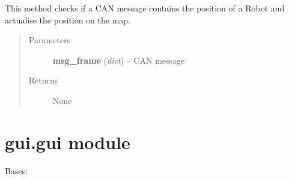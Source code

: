 \documentclass[letterpaper,10pt,english]{sphinxmanual}
\begin{document}
\begin{fulllineitems}
\begin{fulllineitems}
\begin{itemize}
\end{itemize}

\end{fulllineitems}


\begin{fulllineitems}
\label{gui:gui.field.GameField.setpoint}
This method checks if a CAN message contains the position of a Robot and actualise the position on the map.
\begin{quote}\begin{description}
\item[{Parameters}] \leavevmode
\textbf{msg\_frame} (\emph{dict}) -- CAN message

\item[{Returns}] \leavevmode
None

\end{description}\end{quote}

\end{fulllineitems}


\end{fulllineitems}



\section{gui.gui module}
\label{gui:module-gui.gui}\label{gui:gui-gui-module}

\begin{fulllineitems}
\label{gui:gui.gui.CanWindow}
Bases: 

\begin{fulllineitems}
\label{gui:gui.gui.CanWindow.connect_host}
\end{fulllineitems}


\begin{fulllineitems}
\label{gui:gui.gui.CanWindow.init_ui}
\end{fulllineitems}


\begin{fulllineitems}
\label{gui:gui.gui.CanWindow.lost_connection}
\end{fulllineitems}


\end{fulllineitems}
\end{document}
